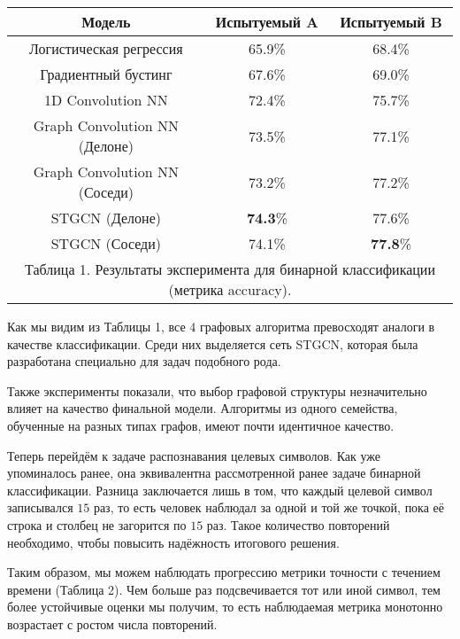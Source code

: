 \documentclass[12pt]{article}
\begin{document}
\begin{center}
\begin{tabular}{ |c|c|c| } 
                
            \hline
            \textbf{Модель} & \textbf{Испытуемый  A} & \textbf{Испытуемый  B} \\
            \hline
            Логистическая регрессия &  65.9\% & 68.4\% \\
            Градиентный бустинг & 67.6\% & 69.0\% \\  
            1D Convolution NN &  72.4\% & 75.7\% \\
            Graph Convolution NN (Делоне) &  73.5\% & 77.1\% \\
            Graph Convolution NN (Соседи) &  73.2\% & 77.2\% \\
            STGCN (Делоне) &  \textbf{74.3}\% & 77.6\% \\
            STGCN (Соседи) &  74.1\% & \textbf{77.8}\% \\
            \hline
            \multicolumn{3}{c}{\footnotesize Таблица 1.
            Результаты эксперимента для бинарной классификации (метрика accuracy).} \\
                       
    \end{tabular}
    \end{center}
    
Как мы видим из Таблицы 1, все $4$ графовых алгоритма превосходят аналоги в качестве классификации. Среди них выделяется сеть STGCN, которая была разработана специально для задач подобного рода.

Также эксперименты показали, что выбор графовой структуры незначительно влияет на качество финальной модели. Алгоритмы из одного семейства, обученные на разных типах графов, имеют почти идентичное качество.

Теперь перейдём к задаче распознавания целевых символов. Как уже упоминалось ранее, она эквивалентна рассмотренной ранее задаче бинарной классификации. Разница заключается лишь в том, что каждый целевой символ записывался $15$ раз, то есть человек наблюдал за одной и той же точкой, пока её строка и столбец не загорится по $15$ раз. Такое количество повторений необходимо, чтобы повысить надёжность итогового решения. 

Таким образом, мы можем наблюдать прогрессию метрики точности с течением времени (Таблица 2). Чем больше раз подсвечивается тот или иной символ, тем более устойчивые оценки мы получим, то есть наблюдаемая метрика монотонно возрастает с ростом числа повторений.
\end{document}
